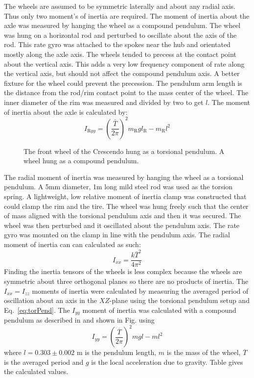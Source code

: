 \documentclass{bmd2010p}
\begin{document}
The wheels are assumed to be symmetric laterally and about any radial axis. Thus only two
moment's of inertia are required. The moment of inertia about the axle was
measured by hanging the wheel as a compound pendulum. The wheel was hung on a
horizontal rod and perturbed to oscillate about the axis of the rod. This rate
gyro was attached to the spokes near the hub and orientated mostly along the
axle axis. The wheels tended to precess at the contact point about the vertical
axis. This adds a very low frequency component of rate along the vertical axis,
but should not affect the compound pendulum axis. A better fixture for the
wheel could prevent the precession. The pendulum arm length is the distance
from the rod/rim contact point to the mass center of the wheel. The inner
diameter of the rim was measured and divided by two to get $l$. The moment of
inertia about the axle is calculated by:
\begin{equation}
    I_{\mathrm{R}yy} = \left(\frac{\bar{T}}{2\pi}\right)^2m_\mathrm{R}gl_\mathrm{R} -
    m_\mathrm{R}l^2
\end{equation}
\begin{figure}[tbp]
    \centering
    \quad
    \caption{ The front wheel of the Crescendo hung as a
    torsional pendulum.  A wheel hung as a compound pendulum.}
    \label{fig:wheelPend}
\end{figure}
The radial moment of inertia was measured by hanging the wheel as a torsional
pendulum. A 5mm diameter, 1m long mild steel rod was used as the torsion
spring. A lightweight, low relative moment of inertia clamp was constructed
that could clamp the rim and the tire. The wheel was hung freely such that the
center of mass aligned with the torsional pendulum axis and then it was
secured. The wheel was then perturbed and it oscillated about the pendulum axis.
The rate gyro was mounted on the clamp in line with the pendulum axis. The
radial moment of inertia can can calculated as such:
\begin{equation}
    I_{xx} = \frac{k\bar{T}^2}{4\pi^2}
\end{equation}
Finding the inertia tensors of the wheels is less complex because the wheels
are symmetric about three orthogonal planes so there are no products of
inertia. The $I_{xx}=I_{zz}$ moments of inertia were calculated by measuring
the averaged period of oscillation about an axis in the $XZ$-plane using the
torsional pendulum setup and Eq.~\ref{eq:torPend}. The $I_{yy}$ moment of
inertia was calculated with a compound pendulum as described in
\cite{Kooijman2006} and shown in Fig. using
\begin{equation}
	I_{yy}=\left(\frac{\overline{T}}{2\pi}\right)^2mgl-ml^2
\label{eq:comPend}
\end{equation}
where $l=0.303\pm0.002$ m is the pendulum length, $m$ is the mass of the wheel,
$\overline{T}$ is the averaged period and $g$ is the local acceleration due to
gravity. Table  gives the calculated values.
\end{document}
